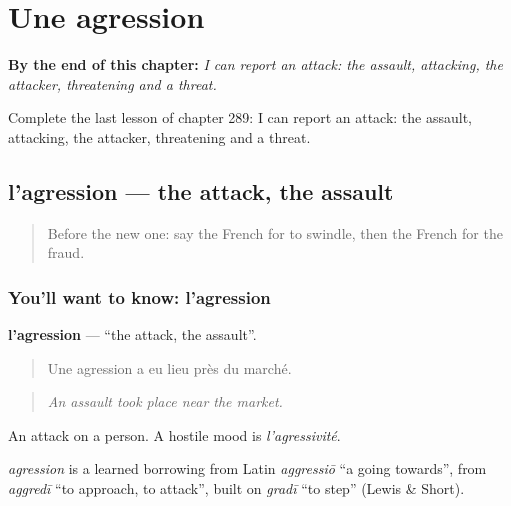 
\chapter{Une agression}
\label{ch:fr-une-agression}

\begin{chapteropening}
\textbf{By the end of this chapter:} \emph{I can report an attack: the assault, attacking, the attacker, threatening and a threat.}

Complete the last lesson of chapter 289: I can report an attack: the assault, attacking, the attacker, threatening and a threat.
\end{chapteropening}

\section[l'agression]{l'agression — the attack, the assault}

\label{lesson:FR-C289-agression}



\begin{quote}
Before the new one: say the French for to swindle, then the French for the fraud.
\end{quote}

\subsection*{You'll want to know: l'agression}
\textbf{l'agression} — \textquotedblleft{}the attack, the assault\textquotedblright{}.

\begin{quote}
Une agression a eu lieu près du marché.
\end{quote}

\begin{quote}
\emph{An assault took place near the market.}
\end{quote}

An attack on a person. A hostile mood is \emph{l'agressivité}.

\begin{cousinweb}
\emph{agression} is a learned borrowing from Latin \emph{aggressiō} \textquotedblleft{}a going towards\textquotedblright{}, from \emph{aggredī} \textquotedblleft{}to approach, to attack\textquotedblright{}, built on \emph{gradī} \textquotedblleft{}to step\textquotedblright{} (Lewis \& Short).
\end{cousinweb}

